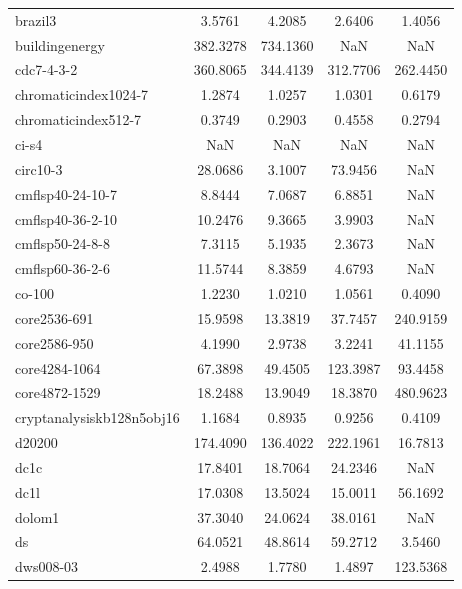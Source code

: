 \begin{longtable}{lcccc}
brazil3                     &    3.5761 &   4.2085 &    2.6406 &    1.4056 \\
buildingenergy              &  382.3278 & 734.1360 &       NaN &       NaN \\
cdc7-4-3-2                  &  360.8065 & 344.4139 &  312.7706 &  262.4450 \\
chromaticindex1024-7        &    1.2874 &   1.0257 &    1.0301 &    0.6179 \\
chromaticindex512-7         &    0.3749 &   0.2903 &    0.4558 &    0.2794 \\
ci-s4                       &       NaN &      NaN &       NaN &       NaN \\
circ10-3                    &   28.0686 &   3.1007 &   73.9456 &       NaN \\
cmflsp40-24-10-7            &    8.8444 &   7.0687 &    6.8851 &       NaN \\
cmflsp40-36-2-10            &   10.2476 &   9.3665 &    3.9903 &       NaN \\
cmflsp50-24-8-8             &    7.3115 &   5.1935 &    2.3673 &       NaN \\
cmflsp60-36-2-6             &   11.5744 &   8.3859 &    4.6793 &       NaN \\
co-100                      &    1.2230 &   1.0210 &    1.0561 &    0.4090 \\
core2536-691                &   15.9598 &  13.3819 &   37.7457 &  240.9159 \\
core2586-950                &    4.1990 &   2.9738 &    3.2241 &   41.1155 \\
core4284-1064               &   67.3898 &  49.4505 &  123.3987 &   93.4458 \\
core4872-1529               &   18.2488 &  13.9049 &   18.3870 &  480.9623 \\
cryptanalysiskb128n5obj16   &    1.1684 &   0.8935 &    0.9256 &    0.4109 \\
d20200                      &  174.4090 & 136.4022 &  222.1961 &   16.7813 \\
dc1c                        &   17.8401 &  18.7064 &   24.2346 &       NaN \\
dc1l                        &   17.0308 &  13.5024 &   15.0011 &   56.1692 \\
dolom1                      &   37.3040 &  24.0624 &   38.0161 &       NaN \\
ds                          &   64.0521 &  48.8614 &   59.2712 &    3.5460 \\
dws008-03                   &    2.4988 &   1.7780 &    1.4897 &  123.5368 \\

\end{longtable}
